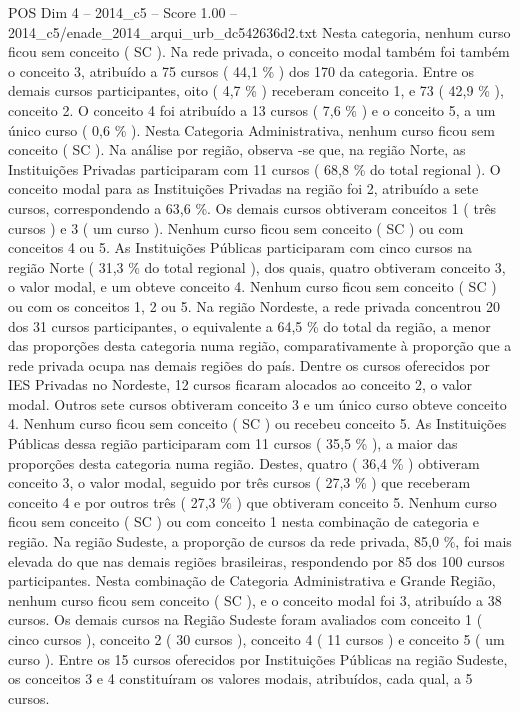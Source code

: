 \begin{textsample}{POS Dim 4 – 2014\_c5 – Score 1.00 – 2014\_c5/enade\_2014\_arqui\_urb\_dc542636d2.txt}
Nesta categoria, nenhum curso ficou sem conceito ( SC ).
Na rede privada, o conceito modal também foi também o conceito 3, atribuído a 75 cursos ( 44,1 \% ) dos 170 da categoria.
Entre os demais cursos participantes, oito ( 4,7 \% ) receberam conceito 1, e 73 ( 42,9 \% ), conceito 2.
O conceito 4 foi atribuído a 13 cursos ( 7,6 \% ) e o conceito 5, a um único curso ( 0,6 \% ).
Nesta Categoria Administrativa, nenhum curso ficou sem conceito ( SC ).
Na análise por região, observa -se que, na região Norte, as Instituições Privadas participaram com 11 cursos ( 68,8 \% do total regional ).
O conceito modal para as Instituições Privadas na região foi 2, atribuído a sete cursos, correspondendo a 63,6 \%.
Os demais cursos obtiveram conceitos 1 ( três cursos ) e 3 ( um curso ).
Nenhum curso ficou sem conceito ( SC ) ou com conceitos 4 ou 5.
As Instituições Públicas participaram com cinco cursos na região Norte ( 31,3 \% do total regional ), dos quais, quatro obtiveram conceito 3, o valor modal, e um obteve conceito 4.
Nenhum curso ficou sem conceito ( SC ) ou com os conceitos 1, 2 ou 5.
Na região Nordeste, a rede privada concentrou 20 dos 31 cursos participantes, o equivalente a 64,5 \% do total da região, a menor das proporções desta categoria numa região, comparativamente à proporção que a rede privada ocupa nas demais regiões do país.
Dentre os cursos oferecidos por IES Privadas no Nordeste, 12 cursos ficaram alocados ao conceito 2, o valor modal.
Outros sete cursos obtiveram conceito 3 e um único curso obteve conceito 4.
Nenhum curso ficou sem conceito ( SC ) ou recebeu conceito 5.
As Instituições Públicas dessa região participaram com 11 cursos ( 35,5 \% ), a maior das proporções desta categoria numa região.
Destes, quatro ( 36,4 \% ) obtiveram conceito 3, o valor modal, seguido por três cursos ( 27,3 \% ) que receberam conceito 4 e por outros três ( 27,3 \% ) que obtiveram conceito 5.
Nenhum curso ficou sem conceito ( SC ) ou com conceito 1 nesta combinação de categoria e região.
Na região Sudeste, a proporção de cursos da rede privada, 85,0 \%, foi mais elevada do que nas demais regiões brasileiras, respondendo por 85 dos 100 cursos participantes.
Nesta combinação de Categoria Administrativa e Grande Região, nenhum curso ficou sem conceito ( SC ), e o conceito modal foi 3, atribuído a 38 cursos.
Os demais cursos na Região Sudeste foram avaliados com conceito 1 ( cinco cursos ), conceito 2 ( 30 cursos ), conceito 4 ( 11 cursos ) e conceito 5 ( um curso ).
Entre os 15 cursos oferecidos por Instituições Públicas na região Sudeste, os conceitos 3 e 4 constituíram os valores modais, atribuídos, cada qual, a 5 cursos.

\end{textsample}
